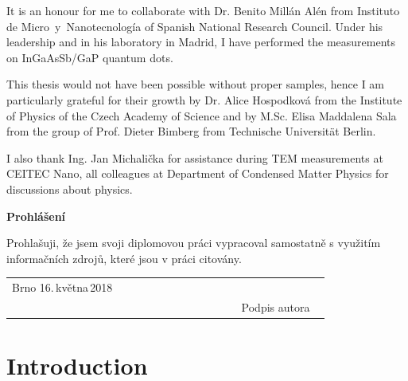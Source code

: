 \documentclass[
a4paper, %
11pt, %
onecolumn, %
openany, %
oldfontcommands,
]{memoir}
\begin{document}
It is an honour for me to collaborate with Dr. Benito Millán Alén from Instituto de Micro~y~Nanotecnología of Spanish National Research Council. Under his leadership and in his laboratory in Madrid, I have performed the measurements on InGaAsSb/GaP quantum dots.


This thesis would not have been possible without proper samples, hence I am particularly grateful for their growth by Dr. Alice Hospodková from the Institute of Physics of the Czech Academy of Science and by M.Sc. Elisa Maddalena Sala from the group of Prof. Dieter Bimberg from Technische Universität Berlin.

I also thank Ing. Jan Michalička for assistance during TEM measurements at CEITEC Nano, all colleagues at Department of Condensed Matter Physics for discussions about physics.


\vfill
\noindent\Large\textbf{Prohlášení}\\ \normalsize

\noindent Prohlašuji, že jsem svoji diplomovou práci vypracoval samostatně
s využitím informačních zdrojů, které jsou v práci citovány.
\vspace{1cm}
\begin{center}
	\centering
	\begin{tabular}{p{0.5\linewidth}p{0.15\linewidth}p{0.25\linewidth}}
		Brno 16.\,května\,2018 &  & \\\cmidrule[0.5pt]{3-3}
		&&\centering Podpis autora \\ 
	\end{tabular}
\end{center}

\newpage
\cleardoublepage


\pagestyle{standard}

\tableofcontents*


\clearpage



\chapter{Introduction}\label{chap:introduction}
\end{document}
